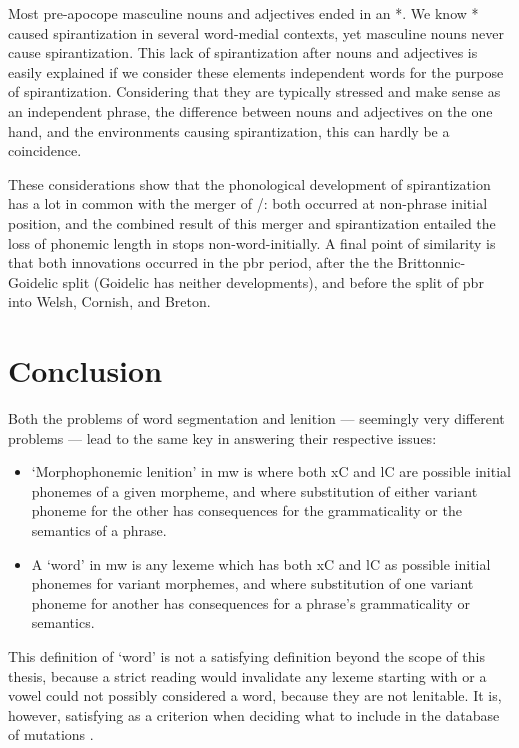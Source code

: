 Most pre-apocope masculine  nouns and adjectives ended in an *.
We know * caused spirantization in several word-medial contexts, yet masculine nouns never cause spirantization.
This lack of spirantization after nouns and adjectives is easily explained if we consider these elements independent words for the purpose of spirantization.
Considering that they are typically stressed and make sense as an independent phrase, the difference between nouns and adjectives on the one hand, and the environments causing spirantization, this can hardly be a coincidence.

These considerations show that the phonological development of spirantization has a lot in common with the merger of \xD/\lT: both occurred at non-phrase initial position, and the combined result of this merger and spirantization entailed the loss of phonemic length in stops non-word-initially.
A final point of similarity is that both innovations occurred in the \gls{pbr} period, after the the Brittonnic-Goidelic split (Goidelic has neither developments), and before the split of \gls{pbr} into Welsh, Cornish, and Breton.

\section{Conclusion}

Both the problems of word segmentation and lenition --- seemingly very different problems --- lead to the same key in answering their respective issues: 
\begin{itemize}
    \item `Morphophonemic lenition' in \gls{mw} is where both \gls{x}\gls{C}  and \gls{l}\gls{C} are possible initial phonemes of a given morpheme, and where  substitution of either variant phoneme for the other has consequences for the grammaticality or the semantics of a phrase.
    \item A `word' in \gls{mw} is any lexeme which has both \gls{x}\gls{C} and \gls{l}\gls{C} as possible initial phonemes for variant morphemes, and where  substitution of one variant phoneme for another has consequences for a phrase's grammaticality or semantics.
\end{itemize}
This definition of `word' is not a satisfying definition beyond the scope of this thesis, because a strict reading would invalidate any lexeme starting with  or a vowel could not possibly considered a word, because they are not lenitable. It is, however, satisfying as a criterion when deciding what to include in the database of mutations .
